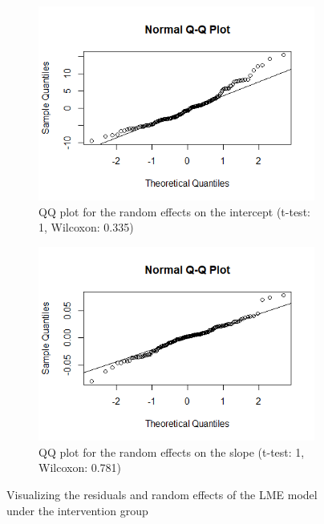 \begin{figure}[H]
\begin{subfigure}{.24\textwidth}
  \includegraphics[width=1\linewidth]{../../plots/qq_intercept_treatment.png}
  \caption{QQ plot for the random effects on the intercept (t-test: 1, Wilcoxon: 0.335)}
  \label{fig:5c}
\end{subfigure}
\begin{subfigure}{.24\textwidth}
  \centering
  \includegraphics[width=1\linewidth]{../../plots/qq_slope_treatment.png}
  \caption{QQ plot for the random effects on the slope (t-test: 1, Wilcoxon: 0.781)}
  \label{fig:5d}
\end{subfigure}
\caption{Visualizing the residuals and random effects of the LME model under the intervention group}
\label{fig:residual.treatment}
\end{figure}
